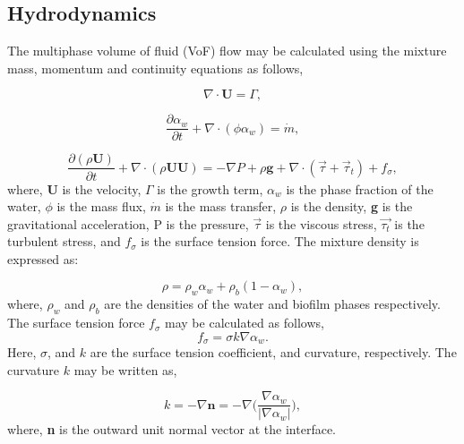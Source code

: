 \subsection{Hydrodynamics}
\label{Hydro}
The multiphase volume of fluid (VoF) flow may be calculated using the mixture mass, momentum and continuity equations as follows,

\begin{equation}
    \label{eq:continuity}
    \nabla \cdot \mathbf{U} = \Gamma,
\end{equation}

\begin{equation}
    \label{eq:mass}
    \frac{\partial \alpha_w}{\partial t} + \nabla\cdot (\phi \alpha_w) = \dot{m},
\end{equation}

\begin{equation}
    \label{eq:momentum}
    \frac{\partial (\rho \mathbf{U})}{\partial t} + \nabla\cdot (\rho \mathbf{U U}) = -\nabla P + \rho \mathbf{g} +\nabla \cdot (\vec{\tau}+\vec{\tau}_t)+f_{\sigma},
\end{equation}
where, $\mathbf{U}$ is the velocity, $\Gamma$ is the growth term, $\alpha_w$ is the phase fraction of the water, ${\phi}$ is the mass flux, ${\dot{m}}$ is the mass transfer, ${\rho}$ is the density, \textbf{g} is the gravitational acceleration, P is the pressure, $\vec{\tau}$ is the viscous stress, $\vec{\tau_t}$ is the turbulent stress, and ${f_{\sigma}}$ is the surface tension force. The mixture density is expressed as:

\begin{equation}
    \label{eq:mixtureDensity}
    \rho = \rho_w \alpha_w + \rho_b (1-\alpha_w),
\end{equation}
where, ${\rho_w}$ and ${\rho_b}$ are the densities of the water and biofilm phases respectively. The surface tension force ${f_{\sigma}}$ may be calculated as follows,
\begin{equation}
    \label{eq:surfaceTension}
    f_{\sigma} = \sigma k \nabla\alpha_w.
\end{equation}
Here, ${\sigma}$, and $k$ are the surface tension coefficient, and curvature, respectively. The curvature $k$ may be written as, 

\begin{equation}
    \label{eq:curvature}
    k = -\nabla \mathbf{n} = -\nabla \Bigg(\frac{\nabla \alpha_w}{\big| \nabla \alpha_w\big|} \Bigg),
\end{equation}
where, \textbf{n} is the outward unit normal vector at the interface.


